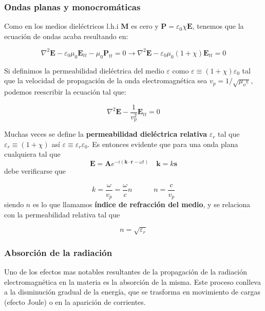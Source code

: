 \documentclass[12pt,a4paper]{article}
\newcommand{\tquad}{\quad \quad \quad}
\newcommand{\En}{\mathbf{E}}
\newcommand{\kn}{\mathbf{k}}
\newcommand{\rn}{\mathbf{r}}
\newcommand{\An}{\mathbf{A}}
\newcommand{\Pn}{\mathbf{P}}
\newcommand{\Mn}{\mathbf{M}}
\newcommand{\sn}{\mathbf{s}}
\numberwithin{equation}{section}
\numberwithin{figure}{section}
\begin{document}
\subsubsection{Ondas planas y monocromáticas}

Como en los medios dieléctricos l.h.i $\Mn$ es cero y $\Pn = \varepsilon_0 \chi \En$, tenemos que la ecuación de ondas acaba resultando en:


\begin{equation}
\nabla^2 \En - \varepsilon_0 \mu_0 \En_{tt} - \mu_0 \Pn_{tt} = 0 \longrightarrow  \nabla^2 \En - \varepsilon_0 \mu_0 (1+\chi) \En_{tt} = 0
\end{equation}

Si definimos la permeabilidad dieléctrica del medio $\varepsilon$ como $\varepsilon  \equiv (1+\chi) \varepsilon_0$  tal que la velocidad de propagación de la onda electromagnética sea $v_p = 1/\sqrt{\mu_o \varepsilon}$, podemos reescribir la ecuación tal que:

\begin{equation}
\nabla^2 \En - \dfrac{1}{v^2_p} \En_{tt} = 0
\end{equation}

Muchas veces se define la \textbf{permeabilidad dieléctrica relativa} $\varepsilon_r$ tal que $\varepsilon_r \equiv (1+\chi)$ así $\varepsilon \equiv \varepsilon_r \varepsilon_0$. Es entonces evidente que para una onda plana cualquiera tal que $$\En = \An e^{-i (\kn \cdot \rn - \omega t)} \quad \kn = k \sn$$
debe verificarse que 

\begin{equation}
k = \dfrac{\omega}{v_p} = \dfrac{\omega}{c} n \tquad n = \dfrac{c}{v_p}
\end{equation}
siendo $n$ es lo que llamamos \textbf{índice de refracción del medio}, y se relaciona con la permeabilidad relativa tal que 

\begin{equation}
n = \sqrt{\varepsilon_r}
\end{equation}

\subsubsection{Absorción de la radiación}

Uno de los efectos mas notables resultantes de la propagación de la radiación electromagnética en la materia es la absorción de la misma. Este proceso conlleva a la disminución gradual de la energía, que se trasforma en movimiento de cargas (efecto Joule) o en la aparición de corrientes.  \\
\end{document}
